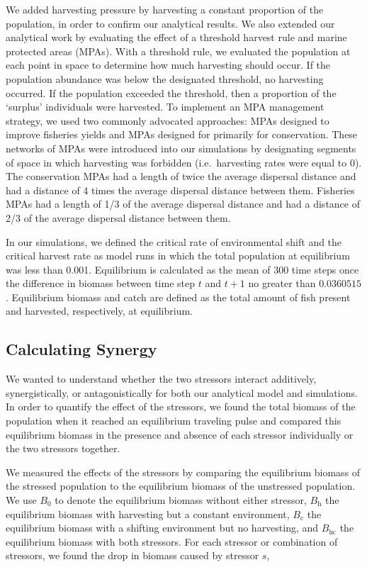 \documentclass[]{article}
\begin{document}
We added harvesting pressure by harvesting a constant proportion of the population, in order to confirm our analytical results. 
We also extended our analytical work by evaluating the effect of a threshold harvest rule and marine protected 
areas (MPAs). With a threshold rule, we evaluated the population at each point in space to determine how 
much harvesting should occur. If the population abundance was below the designated threshold, no 
harvesting occurred. If the population exceeded the threshold, then a proportion of the `surplus' individuals 
were harvested. To implement an MPA management strategy, we used two commonly advocated approaches: 
MPAs designed to improve fisheries yields and MPAs designed for primarily for conservation. These networks 
of MPAs were introduced into our simulations by designating segments of space in which harvesting was 
forbidden (i.e.~harvesting rates were equal to $0$). The conservation MPAs had a length of twice the average 
dispersal distance and had a distance of 4 times the average dispersal distance between them. Fisheries MPAs had a length of 1/3 of the 
average dispersal distance and had a distance of 2/3 of the average dispersal distance between them.

In our simulations, we defined the critical rate of environmental shift and the critical harvest rate as model runs 
in which the total population at equilibrium was less than 0.001. Equilibrium is calculated as the mean of 300 time steps once the difference in biomass between time step $t$ and $t+1$ no greater than $0.0360515$. Equilibrium biomass and catch are defined as the total amount of fish present and harvested, respectively, at equilibrium. 

\subsection{Calculating Synergy }

We wanted to understand whether the two stressors interact 
additively, synergistically, or antagonistically \citep{Crainetal2008} for both our analytical model and simulations. In order to quantify the effect of the 
stressors, we found the total biomass of the population when it reached an equilibrium traveling pulse and 
compared this equilibrium biomass in the presence and absence of each stressor individually or the two stressors together. 

We measured the effects of the stressors by comparing the equilibrium biomass of the stressed population to 
the equilibrium biomass of the unstressed population. We use $B_0$ to denote the equilibrium biomass 
without either stressor, $B_\text{h}$ the equilibrium biomass with harvesting but a constant environment, $B_\text{c}$ the 
equilibrium biomass with a shifting environment but no harvesting, and $B_\text{hc}$ the equilibrium biomass with 
both stressors. For each stressor or combination of stressors, we found the drop in  biomass caused 
by stressor $s$,
\end{document}
